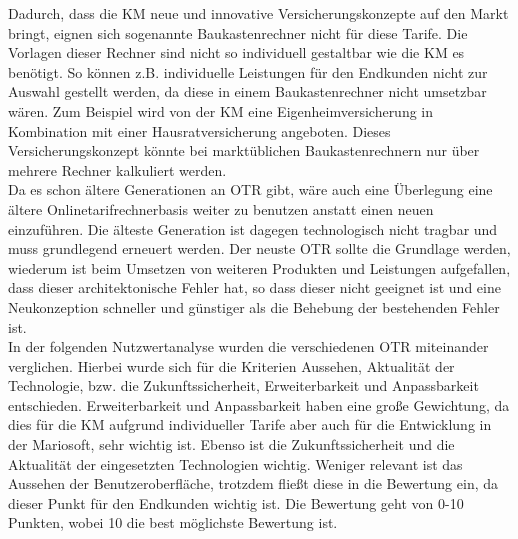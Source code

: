 Dadurch, dass die \ac{KM} neue und innovative Versicherungskonzepte auf den Markt bringt, eignen sich sogenannte Baukastenrechner nicht für diese Tarife. Die Vorlagen dieser Rechner sind nicht so individuell gestaltbar wie die \ac{KM} es benötigt. So können z.B. individuelle Leistungen für den Endkunden nicht zur Auswahl gestellt werden, da diese in einem Baukastenrechner nicht umsetzbar wären. Zum Beispiel wird von der \ac{KM} eine Eigenheimversicherung in Kombination mit einer Hausratversicherung angeboten. Dieses Versicherungskonzept könnte bei marktüblichen Baukastenrechnern nur über mehrere Rechner kalkuliert werden.\\
Da es schon ältere Generationen an \ac{OTR} gibt, wäre auch eine Überlegung eine ältere Onlinetarifrechnerbasis weiter zu benutzen anstatt einen neuen einzuführen. Die älteste Generation ist dagegen technologisch nicht tragbar und muss grundlegend erneuert werden. Der neuste \ac{OTR} sollte die Grundlage werden, wiederum ist beim Umsetzen von weiteren Produkten und Leistungen aufgefallen, dass dieser architektonische Fehler hat, so dass dieser nicht geeignet ist und eine Neukonzeption schneller und günstiger als die Behebung der bestehenden Fehler ist.\\
In der folgenden Nutzwertanalyse wurden die verschiedenen \ac{OTR} miteinander verglichen. Hierbei wurde sich für die Kriterien Aussehen, Aktualität der Technologie, bzw. die Zukunftssicherheit, Erweiterbarkeit und Anpassbarkeit entschieden. Erweiterbarkeit und Anpassbarkeit haben eine große Gewichtung, da dies für die \ac{KM} aufgrund individueller Tarife aber auch für die Entwicklung in der Mariosoft, sehr wichtig ist. Ebenso ist die Zukunftssicherheit und die Aktualität der eingesetzten Technologien wichtig. Weniger relevant ist das Aussehen der Benutzeroberfläche, trotzdem fließt diese in die Bewertung ein, da dieser Punkt für den Endkunden wichtig ist. Die Bewertung geht von 0-10 Punkten, wobei 10 die best möglichste Bewertung ist.\\

